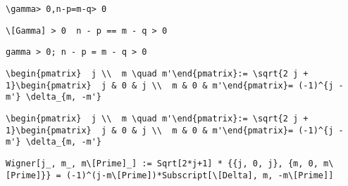 \newsavebox\BVST
\begin{lrbox}{\BVST}
 \begin{minipage}[t]{0.82\textwidth}
  \lstinline[language={[latex]TeX},mathescape,breaklines=true]"\gamma> 0,n-p=m-q> 0"
 \end{minipage}
\end{lrbox}
\newsavebox\BVMM
\begin{lrbox}{\BVMM}
 \begin{minipage}[t]{0.82\textwidth}
  \lstinline[language={[latex]TeX},mathescape,breaklines=true]"\[Gamma] > 0  n - p == m - q > 0"
 \end{minipage}
\end{lrbox}
\newsavebox\BVMA
\begin{lrbox}{\BVMA}
 \begin{minipage}[t]{0.82\textwidth}
  \lstinline[language={[latex]TeX},mathescape,breaklines=true]"gamma > 0; n - p = m - q > 0"
 \end{minipage}
\end{lrbox}
\newsavebox\BWT
\begin{lrbox}{\BWT}
 \begin{minipage}[t]{0.82\textwidth}
  \lstinline[language={[latex]TeX},mathescape,breaklines=true]"\begin{pmatrix}  j \\  m \quad m'\end{pmatrix}:= \sqrt{2 j + 1}\begin{pmatrix}  j & 0 & j \\  m & 0 & m'\end{pmatrix}= (-1)^{j - m'} \delta_{m, -m'}"
 \end{minipage}
\end{lrbox}
\newsavebox\BWST
\begin{lrbox}{\BWST}
 \begin{minipage}[t]{0.82\textwidth}
  \lstinline[language={[latex]TeX},mathescape,breaklines=true]"\begin{pmatrix}  j \\  m \quad m'\end{pmatrix}:= \sqrt{2 j + 1}\begin{pmatrix}  j & 0 & j \\  m & 0 & m'\end{pmatrix}= (-1)^{j - m'} \delta_{m, -m'}"
 \end{minipage}
\end{lrbox}
\newsavebox\BWMM
\begin{lrbox}{\BWMM}
 \begin{minipage}[t]{0.82\textwidth}
  \lstinline[language={[latex]TeX},mathescape,breaklines=true]"Wigner[j_, m_, m\[Prime]_] := Sqrt[2*j+1] * {{j, 0, j}, {m, 0, m\[Prime]}} = (-1)^(j-m\[Prime])*Subscript[\[Delta], m, -m\[Prime]]"
 \end{minipage}
\end{lrbox}
